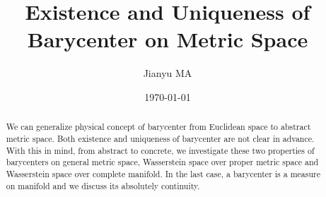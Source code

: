 \documentclass{report}
\title{Existence and Uniqueness of Barycenter on Metric Space}
\author{Jianyu MA}
\date{\today}
\theoremstyle{remark}
\theoremstyle{definition}
\begin{document}
\maketitle

\begin{abstract}
	We can generalize physical concept of barycenter from Euclidean space to abstract metric space.
	Both existence and uniqueness of barycenter are not clear in advance.
	With this in mind, from abstract to concrete,
	we investigate these two properties of barycenters on general metric space,
	Wasserstein space over proper metric space and Wasserstein space over complete manifold.
	In the last case, a barycenter is a measure on manifold and we discuss its absolutely continuity.
\end{abstract}

\tableofcontents













% 
% 
% 

\printbibliography
\end{document}
